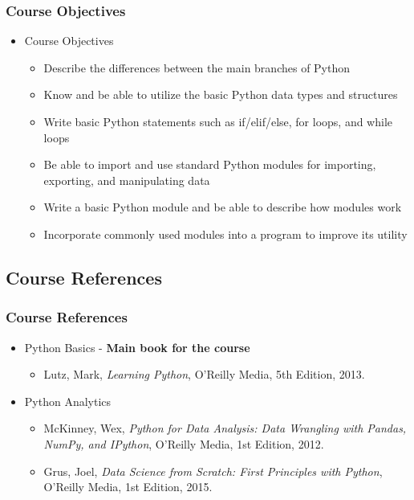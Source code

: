 \documentclass[mini frame in current subsection]{beamer}
\begin{document}
		\begin{frame}
			\frametitle{Course Objectives}
			\begin{itemize}
				\item Course Objectives
					\begin{itemize}
						\vfill\item  Describe the differences between the main branches of Python
						\vfill\item  Know and be able to utilize the basic Python data types and structures
						\vfill\item  Write basic Python statements such as if/elif/else, for loops, and while loops
						\vfill\item  Be able to import and use standard Python modules for importing, exporting, and manipulating data
						\vfill\item  Write a basic Python module and be able to describe how modules work
						\vfill\item  Incorporate commonly used modules into a program to improve its utility
					\end{itemize}
			\end{itemize}
		\end{frame}
		
	\subsection{Course References}
		\begin{frame}
			\frametitle{Course References}

			\begin{itemize}
				\vfill\item Python Basics - \textbf{Main book for the course}
					\begin{itemize}
						\item  Lutz, Mark, {\textit{Learning Python}}, O'Reilly Media, 5th Edition, 2013.
					\end{itemize}
				\vfill\item Python Analytics
					\begin{itemize}
						\item McKinney, Wex, {\textit{Python for Data Analysis: Data Wrangling with Pandas, NumPy, and IPython}}, O'Reilly Media, 1st Edition, 2012.
						\item  Grus, Joel, {\textit{Data Science from Scratch:  First Principles with Python}}, O'Reilly Media, 1st Edition, 2015.
					\end{itemize}
				\end{itemize}
		\end{frame}
		
\end{document}
